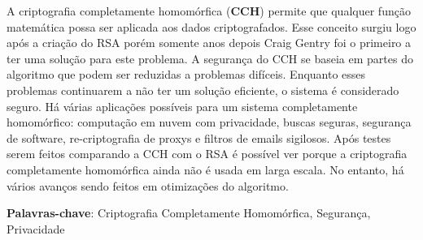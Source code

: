 A criptografia completamente homomórfica (\textbf{CCH}) permite que qualquer função matemática possa ser aplicada aos dados criptografados. Esse conceito surgiu logo após a criação do RSA porém somente anos depois Craig Gentry foi o primeiro a ter uma solução para este problema.
A segurança do CCH se baseia em partes do algoritmo que podem ser reduzidas a problemas difíceis. Enquanto esses problemas continuarem a não ter um solução eficiente, o sistema é considerado seguro.
Há várias aplicações possíveis para um sistema completamente homomórfico: computação em nuvem com privacidade, buscas seguras, segurança de software, re-criptografia de proxys e filtros de emails sigilosos.
Após testes serem feitos comparando a CCH com o RSA é possível ver porque a criptografia completamente homomórfica ainda não é usada em larga escala. No entanto, há vários avanços sendo feitos em otimizações do algoritmo.

\noindent \textbf{Palavras-chave}: Criptografia Completamente Homomórfica, Segurança, Privacidade
